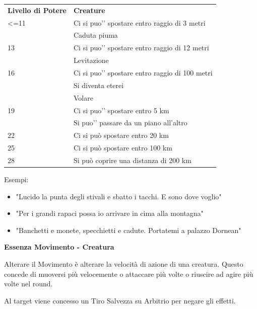 \documentclass[a4paper,11pt,twoside,openany]{book}
\begin{document}
\begin{tabularx}{0.95\textwidth}{lX}
	\toprule
	\textbf{Livello di Potere} & \textbf{Creature}\\
	<=11           & Ci si puo'’ spostare entro raggio di 3 metri       \\
	               & Caduta piuma                                         \\
	13             & Ci si puo'’ spostare entro raggio di 12 metri        \\
	               & Levitazione                                          \\
	16             & Ci si puo'’ spostare entro raggio di 100 metri       \\
	               & Si diventa eterei                                    \\
	               & Volare                                               \\
	19             & Ci si puo'’ spostare entro 5 km                      \\
	               & Si puo'’ passare da un piano all’altro               \\
	22             & Ci si può spostare entro 20 km\\
	25             & Ci si può spostare entro 100 km\\
	28             & Si può coprire una distanza di 200 km\\
\end{tabularx}

\bigskip

Esempi:
\begin{itemize}
	\item
	      "Lucido la punta degli stivali e sbatto i tacchi. E sono dove voglio"
	\item
	      "Per i grandi rapaci possa io arrivare in cima alla montagna"
	\item
	      "Banchetti e monete, specchietti e cadute. Portatemi a palazzo Dornean"
\end{itemize}

\bigskip

\textbf{Essenza Movimento - Creatura}

Alterare il Movimento è alterare la velocità di azione di una creatura.
Questo concede di muoversi più velocemente o attaccare più volte o riuscire ad agire più volte nel round.

Al target viene concesso un Tiro Salvezza su Arbitrio per negare gli effetti.
\end{document}
